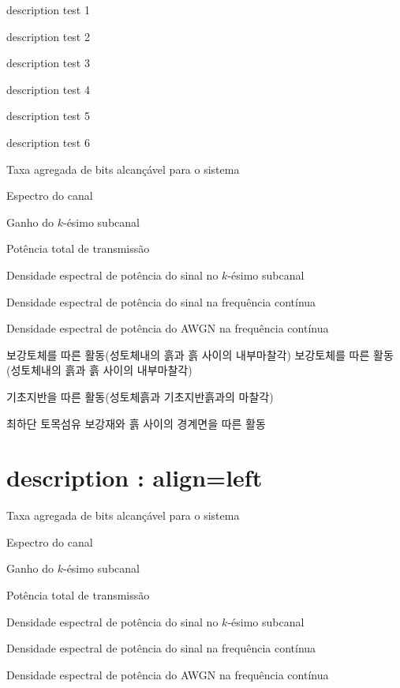 \documentclass[12pt, a4paper, oneside]{book}
\let\stdsection\section
\renewcommand\section{\newpage\stdsection}
\begin{document}
			\begin{description}[style=sameline, leftmargin=2cm]
			\setlength\topsep{0.0em}
			\setlength\itemsep{-0.5em}

			\item	[description 1]	description test 1
			\item	[description]		description test 2
			\item	[descrip]			description test 3
			\item	[descrip]			description test 4
			\item	[desc]			description test 5
			\item	[d]				description test 6
			\item[$b$] Taxa agregada de bits alcançável para o sistema
			\item[$H(f)$] Espectro do canal
			\item[$H_k$] Ganho do $k$-ésimo subcanal
			\item[$P_x$] Potência total de transmissão
			\item[$s_k$] Densidade espectral de potência do sinal no $k$-ésimo subcanal
			\item[$Sx(f)$] Densidade espectral de potência do sinal na frequência contínua
			\item[$Sn(f)$] Densidade espectral de potência do AWGN na frequência contínua
			\item[1]	보강토체를 따른 활동(성토체내의 흙과 흙 사이의 내부마찰각) 
					보강토체를 따른 활동(성토체내의 흙과 흙 사이의 내부마찰각) 
			\item[2]	기초지반을 따른 활동(성토체흙과 기초지반흙과의 마찰각) 
			\item[3]	최하단 토목섬유 보강재와 흙 사이의 경계면을 따른 활동 

			\end{description}

		
	\section{description : align=left}
		\begin{description}[labelsep=3em, align=left]
		\setlength\topsep{0.0em}
		\setlength\itemsep{-1.0em}

		\item[$b$] Taxa agregada de bits alcançável para o sistema
		\item[$H(f)$] Espectro do canal
		\item[$H_k$] Ganho do $k$-ésimo subcanal
		\item[$P_x$] Potência total de transmissão
		\item[$s_k$] Densidade espectral de potência do sinal no $k$-ésimo subcanal
		\item[$Sx(f)$] Densidade espectral de potência do sinal na frequência contínua
		\item[$Sn(f)$] Densidade espectral de potência do AWGN na frequência contínua
		\end{description}
\end{document}
